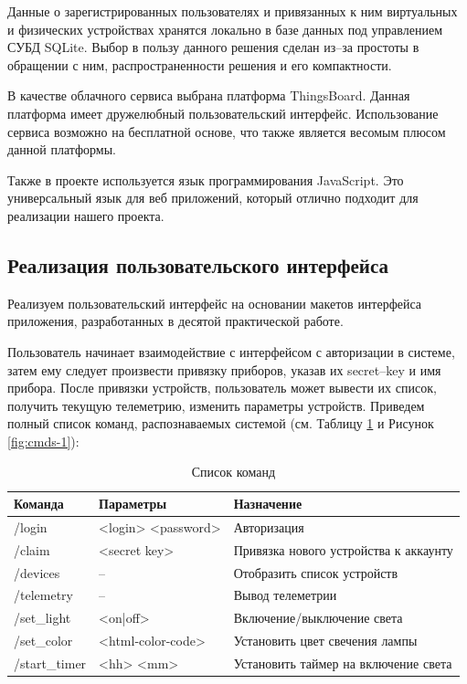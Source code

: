\documentclass[a4paper,14pt]{extarticle}
\begin{document}
Данные о зарегистрированных пользователях и привязанных к ним виртуальных и физических устройствах хранятся локально в базе данных под управлением СУБД SQLite. 
Выбор в пользу данного решения сделан \mbox{из--за} простоты в обращении с ним, распространенности решения и его компактности.

В качестве облачного сервиса выбрана платформа ThingsBoard. 
Данная платформа имеет дружелюбный пользовательский интерфейс. Использование сервиса возможно на бесплатной основе, что также является весомым плюсом данной платформы.

Также в проекте используется язык программирования JavaScript. 
Это универсальный язык для веб приложений, который отлично подходит для реализации нашего проекта.

\subsection{Реализация пользовательского интерфейса}

Реализуем пользовательский интерфейс на основании макетов интерфейса приложения, разработанных в десятой практической работе. 

Пользователь начинает взаимодействие с интерфейсом с авторизации в системе, затем ему следует произвести привязку приборов, указав их \mbox{secret--key} и имя прибора. 
После привязки устройств, пользователь может вывести их список, получить текущую телеметрию, изменить параметры устройств. Приведем полный список команд, распознаваемых системой (см. Таблицу \ref{tab:commands} и Рисунок \ref{fig:cmds-1}):
\begin{table}[h!]
	\caption{Список команд}
	\begin{tabular}{|l|l|l|}
		\hline
		\textbf{Команда} & \textbf{Параметры} & \textbf{Назначение}\\ \hline\hline
		/login & <login> <password> & Авторизация \\ \hline
		/claim & <secret key> & Привязка нового устройства к аккаунту \\ \hline
		/devices & -- & Отобразить список устройств \\ \hline
		/telemetry & -- & Вывод телеметрии \\ \hline
		/set\_light & <on|off> & Включение/выключение света \\ \hline
		/set\_color & <html-color-code> & Установить цвет свечения лампы \\ \hline
		/start\_timer & <hh> <mm> & Установить таймер на включение света \\ \hline
	\end{tabular}
	\label{tab:commands}
\end{table}
\end{document}
